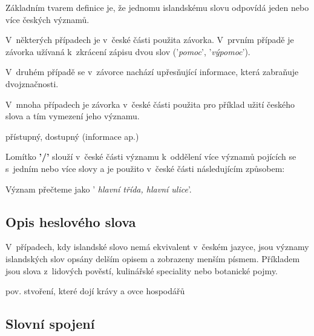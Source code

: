 Základním tvarem definice je, že jednomu islandskému slovu odpovídá jeden nebo více českých významů.

\blspace
  \dicEntry {}   
\blspace

V~některých případech je v~české části použita závorka. V~prvním případě je závorka užívaná k~zkrácení zápisu dvou slov ('\textit{pomoc}', '\textit{výpomoc}').

\blspace
  \dicEntry {}   
\blspace

V~druhém případě se v~závorce nachází upřesňující informace, která zabraňuje dvojznačnosti.

\blspace
  \dicEntry {}    {\footnotesize {}}
\blspace

V~mnoha případech je závorka v~české části použita pro příklad užití českého slova a tím vymezení jeho významu.

\blspace
  \dicEntry {}  {přístupný, dostupný (informace ap.)}
\blspace

Lomítko \textbf{'/'} slouží v~české části významu k~oddělení více významů pojících se s~jedním nebo více slovy a je použito v~české části následujícím způsobem:

\blspace
  \dicEntry {}   
\blspace

Význam přečteme jako ' \textit{hlavní třída, hlavní ulice}'.

\subsection*{Opis heslového slova}

V~případech, kdy islandské slovo nemá ekvivalent v~českém jazyce, jsou významy islandských slov opsány delším opisem a zobrazeny menším písmem. Příkladem jsou slova z~lidových pověstí, kulinářské speciality nebo botanické pojmy.

\blspace
  \dicEntry {}   {\footnotesize{pov.}} {\footnotesize{stvoření, které dojí krávy a ovce hospodářů}}
\blspace

\subsection*{Slovní spojení}

